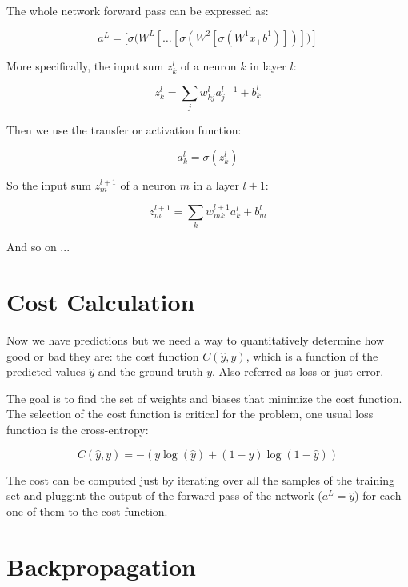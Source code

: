 \documentclass{article}
\begin{document}
The whole network forward pass can be expressed as:

\begin{equation}
a^L = [\sigma(W^L[\dots [\sigma(W^2[\sigma(W^1x_ + b^1)])])]
\end{equation}

More specifically, the input sum $z^l_k$ of a neuron $k$ in layer $l$:

\begin{equation}
z^l_k = \sum_j w_{kj}^l a_j^{l-1} + b_k^l
\end{equation}

Then we use the transfer or activation function:

\begin{equation}
a^l_k = \sigma(z^l_k)
\end{equation}

So the input sum $z_m^{l+1}$ of a neuron $m$ in a layer $l+1$:

\begin{equation}
z_m^{l+1} = \sum_k w^{l+1}_{mk} a_k^l + b_m^l
\end{equation}

And so on ...

\section{Cost Calculation}

Now we have predictions but we need a way to quantitatively determine how good or bad they are: the cost function $C(\hat{y}, y)$, which is a function of the predicted values $\hat{y}$ and the ground truth $y$. Also referred as loss or just error.

The goal is to find the set of weights and biases that minimize the cost function. The selection of the cost function is critical for the problem, one usual loss function is the cross-entropy:

\begin{equation}
C(\hat{y}, y) = -(y \log(\hat{y}) + (1 - y)\log(1 - \hat{y}))
\end{equation}

The cost can be computed just by iterating over all the samples of the training set and pluggint the output of the forward pass of the network ($a^L = \hat{y}$) for each one of them to the cost function.

\section{Backpropagation}
\end{document}
